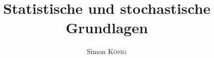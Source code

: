 \documentclass[blue, ngerman]{../LaTeX-Templates/Skript/skript}
\author{Simon \textsc{König}}
\title{Statistische und stochastische Grundlagen \\\subtitleformat{Vorlesungsmitschrieb zum Modul an der Universität Stuttgart}}
\begin{document}
\maketitle

\tableofcontents





\nocite{*}
\end{document}
